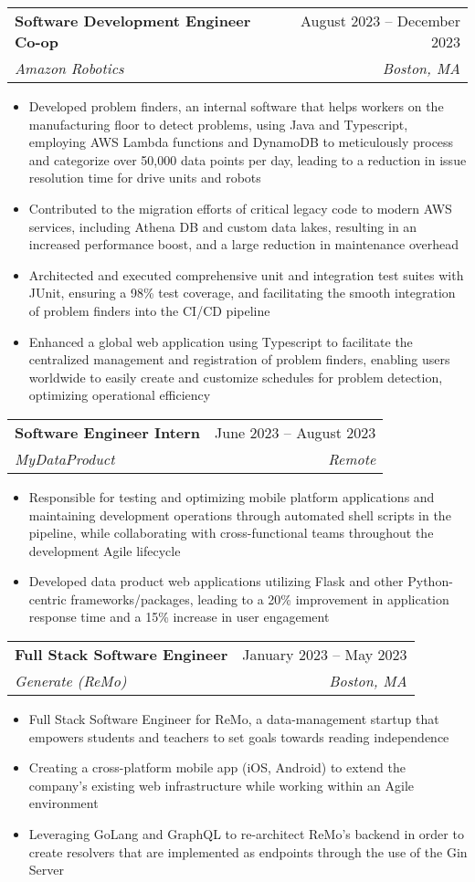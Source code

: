 \documentclass[letterpaper,8pt]{article}
\makeatletter
\newcommand{\resumeItem}[1]{
  \item\small{
    {#1 \vspace{-2pt}}
  }
}
\newcommand{\resumeSubheading}[4]{
  \vspace{-2pt}\item
    \begin{tabular*}{0.97\textwidth}[t]{l@{\extracolsep{\fill}}r}
      \textbf{#1} & #2 \\
      \textit{\small#3} & \textit{\small #4} \\
    \end{tabular*}\vspace{-7pt}
}
\newcommand{\resumeItemListStart}{\begin{itemize}}
\newcommand{\resumeItemListEnd}{\end{itemize}\vspace{-5pt}}
\makeatother
\begin{document}
    \resumeSubheading
      {Software Development Engineer Co-op}{August 2023 -- December 2023}
      {Amazon Robotics}{Boston, MA}
      \resumeItemListStart
      \resumeItem{Developed problem finders, an internal software that helps workers on the manufacturing floor to detect problems, using Java and Typescript, employing AWS Lambda functions and DynamoDB to meticulously process and categorize over 50,000 data points per day, leading to a reduction in issue resolution time for drive units and robots}
      \resumeItem{Contributed to the migration efforts of critical legacy code to modern AWS services, including Athena DB and custom data lakes, resulting in an increased performance boost, and a large reduction in maintenance overhead}
      \resumeItem{Architected and executed comprehensive unit and integration test suites with JUnit, ensuring a 98\% test coverage, and facilitating the smooth integration of problem finders into the CI/CD pipeline}
      \resumeItem{Enhanced a global web application using Typescript to facilitate the centralized management and registration of problem finders, enabling users worldwide to easily create and customize schedules for problem detection, optimizing operational efficiency}
      \resumeItemListEnd

     \resumeSubheading
      {Software Engineer Intern}{June 2023 -- August 2023}
      {MyDataProduct}{Remote}
      \resumeItemListStart
        \resumeItem{Responsible for testing and optimizing mobile platform applications and maintaining development operations through automated shell scripts in the pipeline, while collaborating with cross-functional teams throughout the development Agile lifecycle}
        \resumeItem{Developed data product web applications utilizing Flask and other Python-centric frameworks/packages, leading to a 20\% improvement in application response time and a 15\% increase in user engagement}
      \resumeItemListEnd

    \resumeSubheading
      {Full Stack Software Engineer}{January 2023 -- May 2023}
      {Generate (ReMo)}{Boston, MA}
      \resumeItemListStart
        \resumeItem{Full Stack Software Engineer for ReMo, a data-management startup that empowers students and teachers to set goals towards reading independence}
        \resumeItem{Creating a cross-platform mobile app (iOS, Android) to extend the company’s existing web infrastructure while working within an Agile environment}
        \resumeItem{Leveraging GoLang and GraphQL to re-architect ReMo’s backend in order to create resolvers that are implemented as endpoints through the use of the Gin Server}
      \resumeItemListEnd
\end{document}
